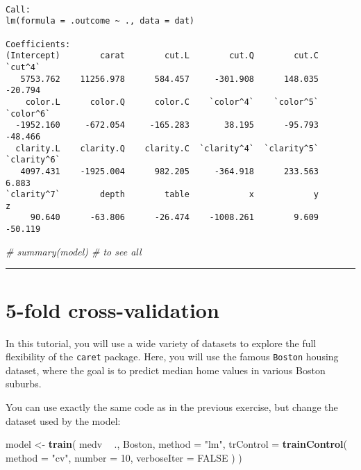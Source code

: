 \documentclass[
]{book}
\newenvironment{Shaded}{\begin{snugshade}}{\end{snugshade}}
\newcommand{\CommentTok}[1]{\textcolor[rgb]{0.56,0.35,0.01}{\textit{#1}}}
\newcommand{\DataTypeTok}[1]{\textcolor[rgb]{0.13,0.29,0.53}{#1}}
\newcommand{\DecValTok}[1]{\textcolor[rgb]{0.00,0.00,0.81}{#1}}
\newcommand{\KeywordTok}[1]{\textcolor[rgb]{0.13,0.29,0.53}{\textbf{#1}}}
\newcommand{\NormalTok}[1]{#1}
\newcommand{\OperatorTok}[1]{\textcolor[rgb]{0.81,0.36,0.00}{\textbf{#1}}}
\newcommand{\OtherTok}[1]{\textcolor[rgb]{0.56,0.35,0.01}{#1}}
\newcommand{\StringTok}[1]{\textcolor[rgb]{0.31,0.60,0.02}{#1}}
\begin{document}
\begin{verbatim}

Call:
lm(formula = .outcome ~ ., data = dat)

Coefficients:
(Intercept)        carat        cut.L        cut.Q        cut.C      `cut^4`  
   5753.762    11256.978      584.457     -301.908      148.035      -20.794  
    color.L      color.Q      color.C    `color^4`    `color^5`    `color^6`  
  -1952.160     -672.054     -165.283       38.195      -95.793      -48.466  
  clarity.L    clarity.Q    clarity.C  `clarity^4`  `clarity^5`  `clarity^6`  
   4097.431    -1925.004      982.205     -364.918      233.563        6.883  
`clarity^7`        depth        table            x            y            z  
     90.640      -63.806      -26.474    -1008.261        9.609      -50.119  
\end{verbatim}

\begin{Shaded}
\begin{Highlighting}[]
\CommentTok{# summary(model)  # to see all}
\end{Highlighting}
\end{Shaded}

\begin{center}\rule{0.5\linewidth}{0.5pt}\end{center}

\hypertarget{fold-cross-validation-1}{%
\section{5-fold cross-validation}\label{fold-cross-validation-1}}

In this tutorial, you will use a wide variety of datasets to explore the full flexibility of the \texttt{caret} package. Here, you will use the famous \texttt{Boston} housing dataset, where the goal is to predict median home values in various Boston suburbs.

You can use exactly the same code as in the previous exercise, but change the dataset used by the model:

\begin{Shaded}
\begin{Highlighting}[]
\NormalTok{model <-}\StringTok{ }\KeywordTok{train}\NormalTok{(}
\NormalTok{  medv }\OperatorTok{~}\StringTok{ }\NormalTok{., Boston,}
  \DataTypeTok{method =} \StringTok{"lm"}\NormalTok{,}
  \DataTypeTok{trControl =} \KeywordTok{trainControl}\NormalTok{(}
    \DataTypeTok{method =} \StringTok{"cv"}\NormalTok{, }\DataTypeTok{number =} \DecValTok{10}\NormalTok{,}
    \DataTypeTok{verboseIter =} \OtherTok{FALSE}
\NormalTok{  )}
\NormalTok{)}
\end{Highlighting}
\end{Shaded}
\end{document}
